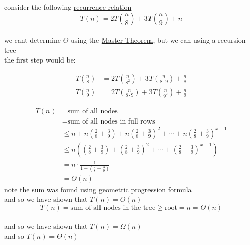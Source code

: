 \documentclass[a4paper,12pt]{article}
\begin{document}
\begin{my_example}
consider the following \hyperref[sec:org4c65e1c]{recurrence relation}\\
\[
  T(n) = 2T\left(\frac{n}{8}\right) + 3T\left(\frac{n}{9}\right) + n
\]\\
we cant determine \(\Theta\) using the \hyperref[sec:org56dacba]{Master Theorem}, but we can using a recursion tree\\
the first step would be:\\
\begin{center}

\end{center}

\begin{align*}
  T\left(\frac{n}{8}\right) &= 2T\left(\frac{n}{8^2}\right) + 3T\left(\frac{n}{8\cdot9}\right) + \frac{n}{8}\\
  T\left(\frac{n}{9}\right) &= 2T\left(\frac{n}{8\cdot9}\right) + 3T\left(\frac{n}{9^2}\right) + \frac{n}{9}
\end{align*}
\begin{center}

\end{center}

\begin{align*}
  T(n) &= \text{sum of all nodes}\\
  &= \text{sum of all nodes in full rows}\\
  &\leq n+n\left(\frac{2}{8}+\frac{3}{9}\right)+n\left(\frac{2}{8}+\frac{3}{9}\right)^2+\cdots+n\left(\frac{2}{8}+\frac{3}{9}\right)^{x-1}\\
  &\leq n\left(\left(\frac{2}{8}+\frac{3}{9}\right)+\left(\frac{2}{8}+\frac{3}{9}\right)^2+\cdots+\left(\frac{2}{8}+\frac{3}{9}\right)^{x-1}\right)\\
  &= n\cdot \frac{1}{1-\left(\frac{2}{8}+\frac{3}{9}\right)}\\
  &= \Theta(n)
\end{align*}
note the sum was found using \href{20220711182517-sum_of_geometric_progression.org}{geometric progression formula}\\
and so we have shown that \(T(n) = O(n)\)\\
\[
  T(n) = \text{sum of all nodes in the tree} \ge \text{root} = n = \Theta(n)
\]\\
and so we have shown that \(T(n) = \Omega(n)\)\\
and so \(T(n) = \Theta(n)\)\\
\end{my_example}
\end{document}
